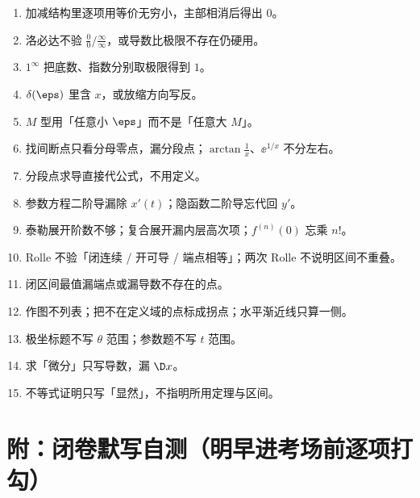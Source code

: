\documentclass[UTF8,11pt]{ctexart}
\begin{document}
\begin{enumerate}[leftmargin=1.8em,itemsep=1pt]
\footnotesize
\item 加减结构里逐项用等价无穷小，主部相消后得出 $0$。
\item 洛必达不验 $\frac00/\frac{\infty}{\infty}$，或导数比极限不存在仍硬用。
\item $1^\infty$ 把底数、指数分别取极限得到 $1$。
\item $\delta(\eps)$ 里含 $x$，或放缩方向写反。
\item $M$ 型用「任意小 $\eps$」而不是「任意大 $M$」。
\item 找间断点只看分母零点，漏分段点；$\arctan\frac1x$、$\ee^{1/x}$ 不分左右。
\item 分段点求导直接代公式，不用定义。
\item 参数方程二阶导漏除 $x'(t)$；隐函数二阶导忘代回 $y'$。
\item 泰勒展开阶数不够；复合展开漏内层高次项；$f^{(n)}(0)$ 忘乘 $n!$。
\item Rolle 不验「闭连续 / 开可导 / 端点相等」；两次 Rolle 不说明区间不重叠。
\item 闭区间最值漏端点或漏导数不存在的点。
\item 作图不列表；把不在定义域的点标成拐点；水平渐近线只算一侧。
\item 极坐标题不写 $\theta$ 范围；参数题不写 $t$ 范围。
\item 求「微分」只写导数，漏 $\D x$。
\item 不等式证明只写「显然」，不指明所用定理与区间。
\end{enumerate}

\vspace{2pt}

\newpage
\section*{附：闭卷默写自测（明早进考场前逐项打勾）}

\end{document}
